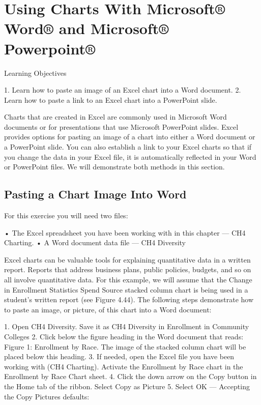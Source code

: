\section{Using Charts With Microsoft® Word® and Microsoft® Powerpoint®}




Learning Objectives


1. Learn how to paste an image of an Excel chart into a Word document.
2. Learn how to paste a link to an Excel chart into a PowerPoint slide.



Charts that are created in Excel are commonly used in Microsoft Word documents or for
presentations that use Microsoft PowerPoint slides. Excel provides options for pasting an image of a
chart into either a Word document or a PowerPoint slide. You can also establish a link to your Excel
charts so that if you change the data in your Excel file, it is automatically reflected in your Word or
PowerPoint files. We will demonstrate both methods in this section.

\subsection{Pasting a Chart Image Into Word}

For this exercise you will need two files:

• The Excel spreadsheet you have been working with in this chapter — CH4 Charting.
• A Word document data file — CH4 Diversity

Excel charts can be valuable tools for explaining quantitative data in a written report. Reports that
address business plans, public policies, budgets, and so on all involve quantitative data. For this
example, we will assume that the Change in Enrollment Statistics Spend Source stacked column chart
is being used in a student’s written report (see Figure 4.44). The following steps demonstrate how to
paste an image, or picture, of this chart into a Word document:

1. Open CH4 Diversity. Save it as CH4 Diversity in Enrollment in Community Colleges
2. Click below the figure heading in the Word document that reads: Figure 1: Enrollment by
Race. The image of the stacked column chart will be placed below this heading.
3. If needed, open the Excel file you have been working with (CH4 Charting). Activate the
Enrollment by Race chart in the Enrollment by Race Chart sheet.
4. Click the down arrow on the Copy button in the Home tab of the ribbon. Select Copy as
Picture
5. Select OK — Accepting the Copy Pictures defaults:


